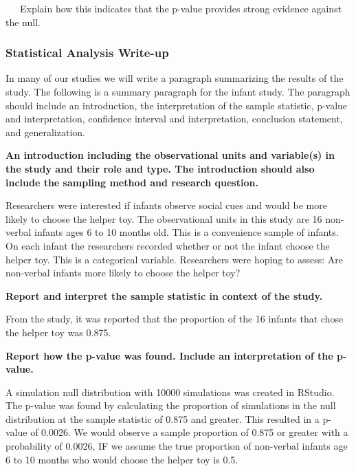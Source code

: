 \documentclass[
]{report}
\begin{document}
~~~Explain how this indicates that the p-value provides strong evidence against the null.

\vspace{0.5in}

\newpage

\subsubsection*{Statistical Analysis Write-up}\label{statistical-analysis-write-up}

In many of our studies we will write a paragraph summarizing the results of the study. The following is a summary paragraph for the infant study. The paragraph should include an introduction, the interpretation of the sample statistic, p-value and interpretation, confidence interval and interpretation, conclusion statement, and generalization.


\textbf{An introduction including the observational units and variable(s) in the study and their role and type. The introduction should also include the sampling method and research question.}


\leftskip=1cm

Researchers were interested if infants observe social cues and would be more likely to choose the helper toy. The observational units in this study are 16 non-verbal infants ages 6 to 10 months old. This is a convenience sample of infants. On each infant the researchers recorded whether or not the infant choose the helper toy. This is a categorical variable. Researchers were hoping to assess: Are non-verbal infants more likely to choose the helper toy?

\leftskip=0cm

\textbf{Report and interpret the sample statistic in context of the study.}

\leftskip=1cm

From the study, it was reported that the proportion of the 16 infants that chose the helper toy was 0.875.

\leftskip=0cm

\textbf{Report how the p-value was found. Include an interpretation of the p-value.}

\leftskip=1cm

A simulation null distribution with 10000 simulations was created in RStudio. The p-value was found by calculating the proportion of simulations in the null distribution at the sample statistic of 0.875 and greater. This resulted in a p-value of 0.0026. We would observe a sample proportion of 0.875 or greater with a probability of 0.0026, IF we assume the true proportion of non-verbal infants age 6 to 10 months who would choose the helper toy is 0.5.
\end{document}
